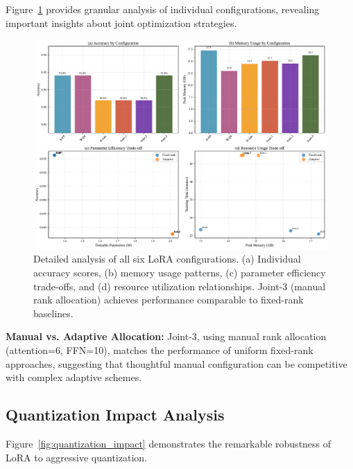 \documentclass[11pt,a4paper]{article}
\begin{document}
Figure~\ref{fig:detailed_analysis} provides granular analysis of individual configurations, revealing important insights about joint optimization strategies.

\begin{figure}[htbp]
    \centering
    \includegraphics[width=\textwidth]{figures/figure2_detailed_analysis.pdf}
    \caption{Detailed analysis of all six LoRA configurations. (a) Individual accuracy scores, (b) memory usage patterns, (c) parameter efficiency trade-offs, and (d) resource utilization relationships. Joint-3 (manual rank allocation) achieves performance comparable to fixed-rank baselines.}
    \label{fig:detailed_analysis}
\end{figure}

\textbf{Manual vs. Adaptive Allocation:} Joint-3, using manual rank allocation (attention=6, FFN=10), matches the performance of uniform fixed-rank approaches, suggesting that thoughtful manual configuration can be competitive with complex adaptive schemes.

\subsection{Quantization Impact Analysis}

Figure~\ref{fig:quantization_impact} demonstrates the remarkable robustness of LoRA to aggressive quantization.
\end{document}
